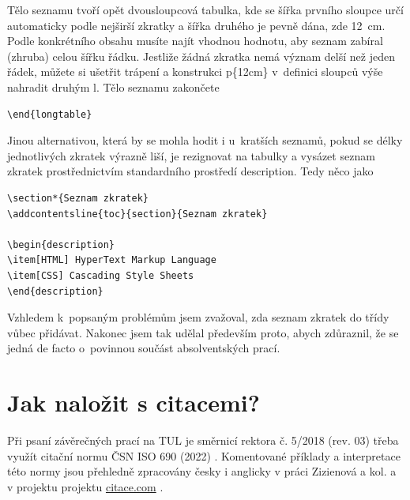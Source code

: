 \documentclass[FZS,DP,EN]{tulthesis}
\newcommand{\argument}[1]{{\ttfamily\color{\tulcolor}#1}}
\newenvironment{myquote}{\begin{list}{}{\setlength\leftmargin\parindent}\item[]}{\end{list}}
\newenvironment{listing}{\begin{myquote}\color{\tulcolor}}{\end{myquote}}
\begin{document}
Tělo seznamu tvoří opět dvousloupcová tabulka, kde se šířka prvního sloupce
určí automaticky podle nejširší zkratky a šířka druhého je pevně dána, zde
12~cm. Podle konkrétního obsahu musíte najít vhodnou hodnotu, aby seznam
zabíral (zhruba) celou šířku řádku. Jestliže žádná zkratka nemá význam delší
než jeden řádek, můžete si ušetřit trápení a konstrukci \argument{p\{12cm\}}
v~definici sloupců výše nahradit druhým \argument{l}. Tělo seznamu zakončete

\begin{listing}
\begin{verbatim}
\end{longtable}
\end{verbatim}
\end{listing}

Jinou alternativou, která by se mohla hodit i u~kratších seznamů, pokud se
délky jednotlivých zkratek výrazně liší, je rezignovat na tabulky a vysázet
seznam zkratek prostřednictvím standardního prostředí \argument{description}.
Tedy něco jako

\begin{listing}
\begin{verbatim}
\section*{Seznam zkratek}
\addcontentsline{toc}{section}{Seznam zkratek}

\begin{description}
\item[HTML] HyperText Markup Language
\item[CSS] Cascading Style Sheets
\end{description}
\end{verbatim}
\end{listing}

Vzhledem k~popsaným problémům jsem zvažoval, zda seznam zkratek do třídy vůbec
přidávat. Nakonec jsem tak udělal především proto, abych zdůraznil, že se jedná
de facto o~povinnou součást absolventských prací.

\chapter{Jak naložit s citacemi?}

Při psaní závěrečných prací na TUL je směrnicí rektora č. 5/2018 (rev. 03) třeba využít citační normu ČSN ISO 690 (2022) \cite{csniso690_2022}. Komentované příklady a interpretace této normy jsou  přehledně zpracovány česky i anglicky v práci Zizienová a kol.  a v projektu projektu \hyperlink{citace.com}{citace.com} \cite{Zizienova2023CZ,Zizienova2023EN,webCitaceCOM}.
\end{document}
